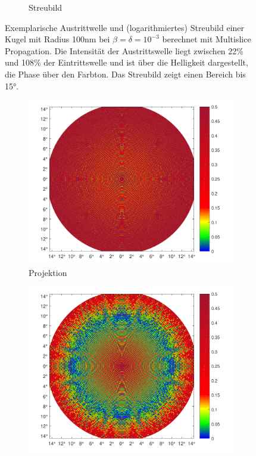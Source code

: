 \begin{figure}
\begin{subfigure}[b]{0.45\textwidth}
		\caption{Streubild}
		\label{fig:scatter}
	\end{subfigure}
	\caption[Austrittswelle und Streubild einer Kugel]{Exemplarische Austrittwelle und (logarithmiertes) Streubild einer Kugel mit Radius 100\si{nm} bei $\beta=\delta=10^{-3}$ berechnet mit Multislice Propagation. Die Intensität der Austrittswelle liegt zwischen 22\% und 108\% der Eintrittswelle und ist über die Helligkeit dargestellt, die Phase über den Farbton. Das Streubild zeigt einen Bereich bis 15°.}
	\label{fig:exitscatter}
\end{figure}


\begin{figure}
	\centering
	\begin{subfigure}[b]{0.45\textwidth}
		\includegraphics[width=\textwidth]{images/fig_sim_relerror_FTproj-r100-bd1e-3.pdf}
		\caption{Projektion}
	\end{subfigure}
	\begin{subfigure}[b]{0.45\textwidth}
		\includegraphics[width=\textwidth]{images/fig_sim_relerror_msft-r100-bd1e-3.pdf}

\end{subfigure}
\end{figure}
